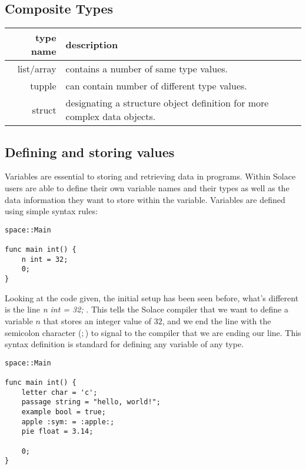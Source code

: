 \documentclass{article}
\begin{document}
\subsection{Composite Types}
\begin{center}
\begin{tabular}{|r|l|}
	\hline
	type name & description \\
	\hline
	\hline
	list/array & contains a number of same type values. \\
	tupple & can contain number of different type values. \\
	struct & designating a structure object definition for more complex data objects. \\
	\hline
\end{tabular}
\end{center}

\subsection{Defining and storing values}

Variables are essential to storing and retrieving data in programs. Within Solace users are able to define their own variable names and their types
as well as the data information they want to store within the variable. Variables are defined using simple syntax rules:

\begin{lstlisting}
space::Main

func main int() {
	n int = 32;
 	0;
}
\end{lstlisting}

Looking at the code given, the initial setup has been seen before, what's different is the line \textit{n int = 32;} . This tells the Solace compiler that we want
to define a variable $n$ that stores an integer value of $32$, and we end the line with the semicolon character ($;$) to signal to the compiler that we are ending our
line. This syntax definition is standard for defining any variable of any type.

\begin{lstlisting}
space::Main

func main int() {
	letter char = 'c';
	passage string = "hello, world!";
 	example bool = true;
  	apple :sym: = :apple:;
   	pie float = 3.14;

 	0;
}
\end{lstlisting}
\end{document}
